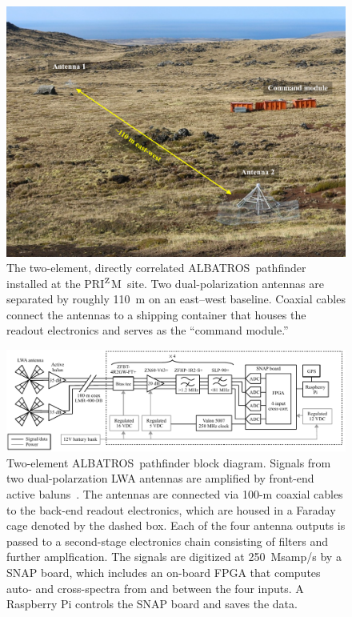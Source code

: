 \documentclass{ws-jai}
\def\albatros{ALBATROS}
\def\prizm{PRI$^{\rm Z}$M}
\begin{document}
\begin{figure}
  \begin{center}
    \includegraphics[width=0.7\linewidth]{Figures/albatros_2elem/albatros_2elem.pdf}
    \caption{The two-element, directly correlated
      \albatros\ pathfinder installed at the \prizm\ site.  Two
      dual-polarization antennas are separated by roughly 110~m on an
      east--west baseline. Coaxial cables connect the antennas to a
      shipping container that houses the readout electronics and
      serves as the ``command module.''}
    \label{Fig:albatros2}
  \end{center}
\end{figure}

\begin{figure}
  \begin{center} \includegraphics[width=1.0\linewidth]{Figures/albatros_2elem_schematic/albatros_2elem_schematic.pdf}
    \caption{Two-element \albatros\ pathfinder block diagram.  Signals
      from two dual-polarzation LWA antennas are amplified by
      front-end active baluns~\citep{2012PASP..124.1090H}.  The
      antennas are connected via 100-m coaxial cables to the back-end
      readout electronics, which are housed in a Faraday cage denoted
      by the dashed box.  Each of the four antenna outputs is passed
      to a second-stage electronics chain consisting of filters and
      further amplfication.  The signals are digitized at 250~Msamp/s
      by a SNAP board, which includes an on-board FPGA that computes
      auto- and cross-spectra from and between the four inputs.  A
      Raspberry Pi controls the SNAP board and saves the data.}
    \label{Fig:albatros2_schem}
  \end{center}
\end{figure}
\end{document}

